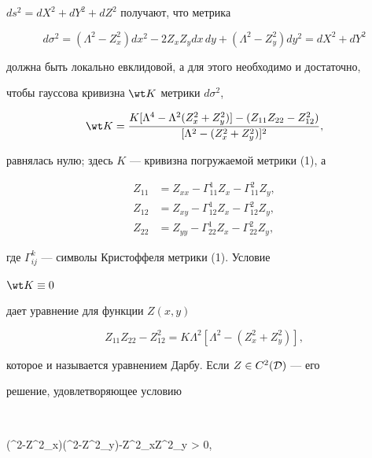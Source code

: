 $ds^2=dX^2+dY^2+dZ^2$ получают, что метрика 


\begin{equation} 


d\sigma^2=(\Lambda^2-Z^2_x)dx^2-2Z_xZ_ydx\,dy+ 


(\Lambda^2-Z^2_y)dy^2=dX^2+dY^2 


\end{equation} 


должна быть локально евклидовой, а для этого необходимо и достаточно, 


чтобы гауссова кривизна $\wt K$ метрики $d\sigma^2$, 


\begin{equation} 


\wt K= 


\frac{K[\Lambda^4-\Lambda^2(Z^2_x+Z^2_y)]-(Z_{11}Z_{22}-Z^2_{12})} 


{[\Lambda^2-(Z^2_x+Z^2_y)]^2},


\end{equation} 


равнялась нулю; здесь $K$ --- кривизна погружаемой метрики (1), а 


\begin{align*} 


Z_{11}&=Z_{xx}-\Gamma^1_{11}Z_x-\Gamma^2_{11}Z_y,\\ 


Z_{12}&=Z_{xy}-\Gamma^1_{12}Z_x-\Gamma^2_{12}Z_y,\\ 


Z_{22}&=Z_{yy}-\Gamma^1_{22}Z_x-\Gamma^2_{22}Z_y, 


\end{align*} 


где $\Gamma^k_{ij}$ --- символы Кристоффеля метрики (1). Условие


$\wt K\equiv 0$ 


дает уравнение для функции $Z(x,y)$ 


\begin{equation} 


Z_{11}Z_{22}-Z_{12}^2=K\Lambda^2[\Lambda^2-(Z^2_x+Z^2_y)], 


\end{equation} 


которое и называется уравнением Дарбу. Если $Z\in C^2(\cal D)$ --- его 


решение, удовлетворяющее условию 


$$ 


(\Lambda^2-Z^2_x)(\Lambda^2-Z^2_y)-Z^2_xZ^2_y > 0, 


